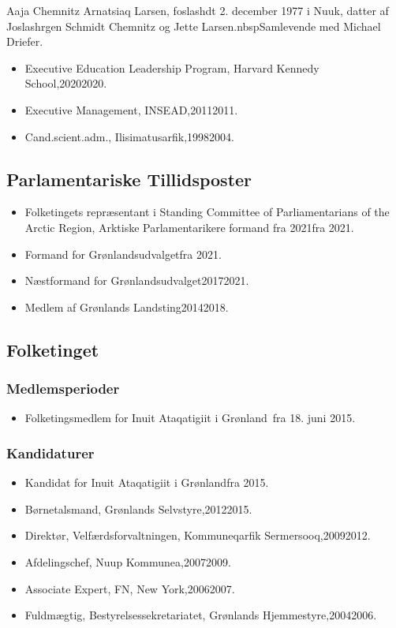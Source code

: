 \documentclass[11pt, a4paper]{awesome-cv}
\begin{document}
\makecvheader[R]
\makelettertitle
\begin{cvletter}
Aaja Chemnitz Arnatsiaq Larsen, foslashdt 2. december 1977 i Nuuk, datter af Joslashrgen Schmidt Chemnitz og Jette Larsen.nbspSamlevende med Michael Driefer.

\begin{itemize}
\item Executive Education Leadership Program, Harvard Kennedy School,20202020.
\item Executive Management, INSEAD,20112011.
\item Cand.scient.adm., Ilisimatusarfik,19982004.
\end{itemize}
\subsection*{Parlamentariske Tillidsposter}
\begin{itemize}
\item Folketingets repræsentant i Standing Committee of Parliamentarians of the Arctic Region, Arktiske Parlamentarikere formand fra 2021fra 2021.
\item Formand for Grønlandsudvalgetfra 2021.
\item Næstformand for Grønlandsudvalget20172021.
\item Medlem af Grønlands Landsting20142018.
\end{itemize}
\subsection*{Folketinget}
\subsubsection*{Medlemsperioder}
\begin{itemize}
\item Folketingsmedlem for Inuit Ataqatigiit i Grønland fra 18. juni 2015.
\end{itemize}
\subsubsection*{Kandidaturer}
\begin{itemize}
\item Kandidat for Inuit Ataqatigiit i Grønlandfra 2015.
\end{itemize}
\begin{itemize}
\item Børnetalsmand, Grønlands Selvstyre,20122015.
\item Direktør, Velfærdsforvaltningen, Kommuneqarfik Sermersooq,20092012.
\item Afdelingschef, Nuup Kommunea,20072009.
\item Associate Expert, FN, New York,20062007.
\item Fuldmægtig, Bestyrelsessekretariatet, Grønlands Hjemmestyre,20042006.
\end{itemize}
\end{cvletter}
\end{document}
